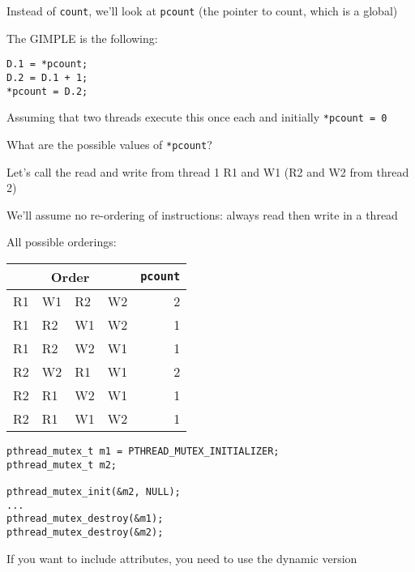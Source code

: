  \begin{slide}


    Instead of \texttt{count}, we'll look at \texttt{pcount} (the pointer to
    count, which is a global)
    \medskip

    The GIMPLE is the following:
    \begin{verbatim}
D.1 = *pcount;
D.2 = D.1 + 1;
*pcount = D.2;
    \end{verbatim}
    \medskip
    
    Assuming that two threads execute this once each
    and initially \texttt{*pcount = 0}

    \leftspace{}What are the possible values of \texttt{*pcount}?

  \end{slide}

  \begin{slide}


    Let's call the read and write from thread 1 R1 and W1 (R2 and W2 from thread 2)
    \medskip

    We'll assume no re-ordering of instructions: always read then write in
    a thread
    \medskip

    All possible orderings:

    \begin{center}
      \begin{tabular}{llll|r}
        \multicolumn{4}{c|}{Order} & {\tt *pcount}\\
        \hline
        R1 & W1 & R2 & W2 & 2 \\
        R1 & R2 & W1 & W2 & 1 \\
        R1 & R2 & W2 & W1 & 1 \\
        R2 & W2 & R1 & W1 & 2 \\
        R2 & R1 & W2 & W1 & 1 \\
        R2 & R1 & W1 & W2 & 1 \\
      \end{tabular}
    \end{center}

  \end{slide}

  \begin{slide}


    \begin{verbatim}
pthread_mutex_t m1 = PTHREAD_MUTEX_INITIALIZER;
pthread_mutex_t m2;

pthread_mutex_init(&m2, NULL);
...
pthread_mutex_destroy(&m1);
pthread_mutex_destroy(&m2);
    \end{verbatim}
    \medskip

    If you want to include attributes, you need to use the dynamic version

  \end{slide}

